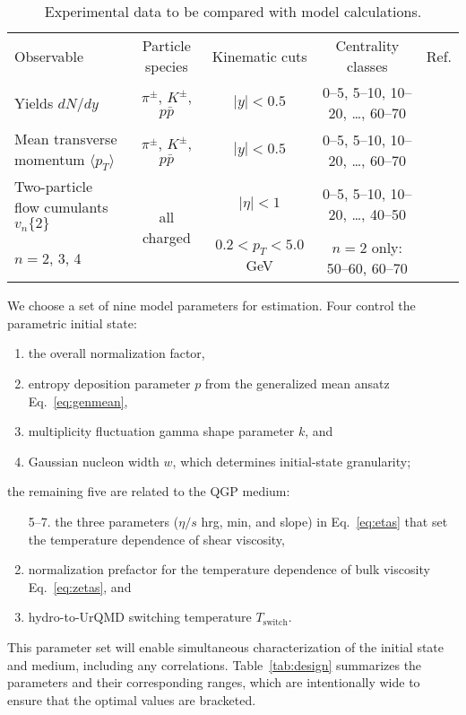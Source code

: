 \documentclass[aps,prc,reprint,amsmath,nofootinbib,superscriptaddress]{revtex4-1}
\newcommand{\avg}[1]{\langle #1 \rangle}
\newcommand{\vnk}[2]{v_#1\{#2\}}
\newcommand{\paddedhline}{\noalign{\smallskip}\hline\noalign{\smallskip}}
\begin{document}
\begin{table*}
  \caption{
    \label{tab:observables}
    Experimental data to be compared with model calculations.
  }
  \begin{ruledtabular}
  \begin{tabular}{lcccc}
    Observable & Particle species & Kinematic cuts & Centrality classes & Ref. \\
    \paddedhline
    Yields $dN/dy$                       & $\pi^\pm$, $K^\pm$, $p\bar p$ &
    $|y| < 0.5$ & 0--5, 5--10, 10--20, \ldots, 60--70 & \cite{Abelev:2013vea} \\
    \noalign{\smallskip}
    Mean transverse momentum $\avg{p_T}$ & $\pi^\pm$, $K^\pm$, $p\bar p$ &
    $|y| < 0.5$ & 0--5, 5--10, 10--20, \ldots, 60--70 & \cite{Abelev:2013vea} \\
    \noalign{\smallskip}
    Two-particle flow cumulants $\vnk n 2$ & \multirow{2}{*}{all charged} &
    $|\eta| < 1$ & 0--5, 5--10, 10--20, \ldots, 40--50 &
    \multirow{2}{*}{\cite{ALICE:2011ab}} \\
    $n = 2$, 3, 4 & & $0.2 < p_T < 5.0$ GeV & $n = 2$ only: 50--60, 60--70 & \\
  \end{tabular}
  \end{ruledtabular}
\end{table*}

We choose a set of nine model parameters for estimation.
Four control the parametric initial state:
\begin{enumerate}
  \item the overall normalization factor,
  \item entropy deposition parameter $p$ from the generalized mean ansatz Eq.~\eqref{eq:genmean},
  \item multiplicity fluctuation gamma shape parameter $k$, and
  \item Gaussian nucleon width $w$, which determines initial-state granularity;
\end{enumerate}
the remaining five are related to the QGP medium:
\begin{enumerate}
  \item[5--7.] the three parameters ($\eta/s$ hrg, min, and slope) in Eq.~\eqref{eq:etas} that set the temperature dependence of shear viscosity,
  \setcounter{enumi}{7}
  \item normalization prefactor for the temperature dependence of bulk viscosity Eq.~\eqref{eq:zetas}, and
  \item hydro-to-UrQMD switching temperature $T_\text{switch}$.
\end{enumerate}
This parameter set will enable simultaneous characterization of the initial state and medium, including any correlations.
Table~\ref{tab:design} summarizes the parameters and their corresponding ranges, which are intentionally wide to ensure that the optimal values are bracketed.
\end{document}
